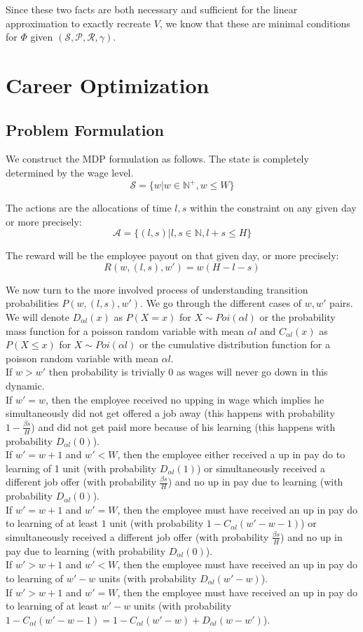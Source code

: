 \documentclass{article}[12pt]
\begin{document}
Since these two facts are both necessary and sufficient for the linear approximation to exactly recreate $V$, we know that these are minimal conditions for $\Phi$ given $(\mathcal{S},\mathcal{P},\mathcal{R}, \gamma)$.
 
\section{Career Optimization}
\subsection{Problem Formulation}
We construct the MDP formulation as follows. The state is completely determined by the wage level.
$$ \mathcal{S} = \{w|w\in\mathbb{N}^+, w\leq W\}$$ 
 
The actions are the allocations of time $l,s$ within the constraint on any given day or more precisely:
$$ \mathcal{A} = \{(l,s) | l,s\in\mathbb{N}, l+s \leq H\}$$

The reward will be the employee payout on that given day, or more precisely:
$$R(w, (l,s), w') = w(H-l-s)$$

We now turn to the more involved process of understanding transition probabilities $P(w,(l,s),w')$. We go through the different cases of $w,w'$ pairs. We will denote $D_{\alpha l}(x)$ as $P(X = x)$ for $X\sim Poi(\alpha l)$ or the probability mass function for a poisson random variable with mean $\alpha l$ and $C_{\alpha l}(x)$ as $P(X \leq x)$ for $X\sim Poi(\alpha l)$ or the cumulative distribution function for a poisson random variable with mean $\alpha l$. \\

If $w>w'$ then probability is trivially 0 as wages will never go down in this dynamic.\\
If $w' = w$, then the employee received no upping in wage which implies he simultaneously did not get offered a job away (this happens with probability $1-\frac{\beta s}{H}$) and did not get paid more because of his learning (this happens with probability $D_{\alpha l}(0)$).\\
If $w' =w+1$ and $w'<W$, then the employee either received a up in pay do to learning of 1 unit (with probability $D_{\alpha l}(1)$) or simultaneously received a different job offer (with probability $\frac{\beta s}{H}$) and no up in pay due to learning (with probability $D_{\alpha l}(0)$).\\
If $w'=w+1$ and $w'=W$, then the employee must have received an up in pay do to learning of at least $1$ unit (with probability $1-C_{\alpha l}(w'-w-1)$) or simultaneously received a different job offer (with probability $\frac{\beta s}{H}$) and no up in pay due to learning (with probability $D_{\alpha l}(0)$).\\
If $w'>w+1$ and $w'<W$, then the employee must have received an up in pay do to learning of $w'-w$ units (with probability $D_{\alpha l}(w'-w)$).\\
If $w'>w+1$ and $w'=W$, then the employee must have received an up in pay do to learning of at least $w'-w$ units (with probability $1-C_{\alpha l}(w'-w-1) = 1-C_{\alpha l}(w'-w) + D_{\alpha l}(w-w')$).\\
\end{document}
